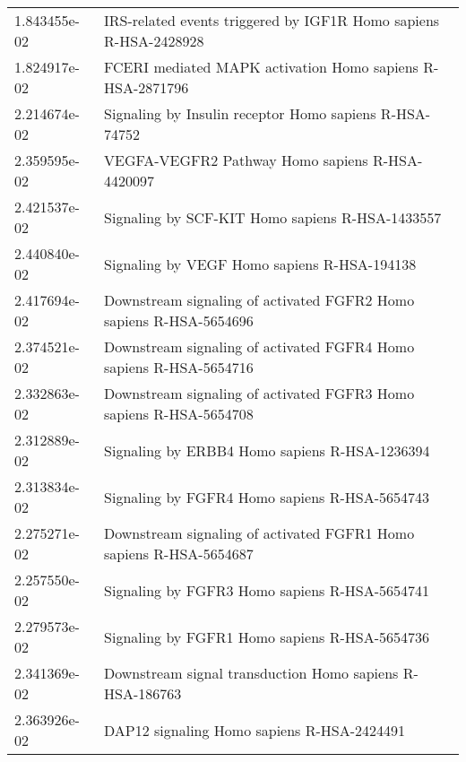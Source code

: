 \begin{longtable}{p{2.4cm}p{14.5cm}}
             1.843455e-02 &                              IRS-related events triggered by IGF1R Homo sapiens R-HSA-2428928 \\
             1.824917e-02 &                                     FCERI mediated MAPK activation Homo sapiens R-HSA-2871796 \\
             2.214674e-02 &                                        Signaling by Insulin receptor Homo sapiens R-HSA-74752 \\
             2.359595e-02 &                                               VEGFA-VEGFR2 Pathway Homo sapiens R-HSA-4420097 \\
             2.421537e-02 &                                               Signaling by SCF-KIT Homo sapiens R-HSA-1433557 \\
             2.440840e-02 &                                                   Signaling by VEGF Homo sapiens R-HSA-194138 \\
             2.417694e-02 &                            Downstream signaling of activated FGFR2 Homo sapiens R-HSA-5654696 \\
             2.374521e-02 &                            Downstream signaling of activated FGFR4 Homo sapiens R-HSA-5654716 \\
             2.332863e-02 &                            Downstream signaling of activated FGFR3 Homo sapiens R-HSA-5654708 \\
             2.312889e-02 &                                                 Signaling by ERBB4 Homo sapiens R-HSA-1236394 \\
             2.313834e-02 &                                                 Signaling by FGFR4 Homo sapiens R-HSA-5654743 \\
             2.275271e-02 &                            Downstream signaling of activated FGFR1 Homo sapiens R-HSA-5654687 \\
             2.257550e-02 &                                                 Signaling by FGFR3 Homo sapiens R-HSA-5654741 \\
             2.279573e-02 &                                                 Signaling by FGFR1 Homo sapiens R-HSA-5654736 \\
             2.341369e-02 &                                      Downstream signal transduction Homo sapiens R-HSA-186763 \\
             2.363926e-02 &                                                    DAP12 signaling Homo sapiens R-HSA-2424491 \\

\end{longtable}
